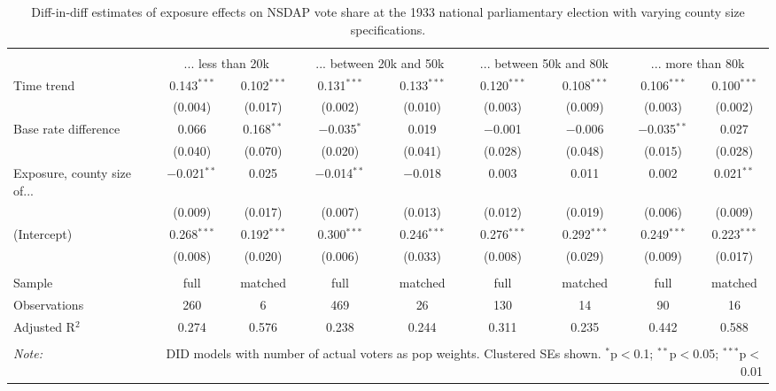 
\begin{table}[!htbp] \centering 
  \caption{Diff-in-diff estimates of exposure effects on NSDAP vote share at the 1933 national parliamentary election with varying county size specifications.\vspace{-.25cm}} 
  \label{tab:nsdap-voteshare-countysize-dd-1933} 
\scriptsize 
\begin{tabular}{@{\extracolsep{5pt}}lcccccccc} 
\\[-1.8ex]\hline 
\hline \\[-1.8ex] 
 & \multicolumn{2}{c}{... less than 20k } & \multicolumn{2}{c}{... between 20k and 50k} & \multicolumn{2}{c}{... between 50k and 80k} & \multicolumn{2}{c}{... more than 80k} \\ 
 \cmidrule(r){2-3}\cmidrule(r){4-5}\cmidrule(r){6-7}\cmidrule(r){8-9}Time trend & 0.143$^{***}$ & 0.102$^{***}$ & 0.131$^{***}$ & 0.133$^{***}$ & 0.120$^{***}$ & 0.108$^{***}$ & 0.106$^{***}$ & 0.100$^{***}$ \\ 
  & (0.004) & (0.017) & (0.002) & (0.010) & (0.003) & (0.009) & (0.003) & (0.002) \\ 
  Base rate difference & 0.066 & 0.168$^{**}$ & $-$0.035$^{*}$ & 0.019 & $-$0.001 & $-$0.006 & $-$0.035$^{**}$ & 0.027 \\ 
  & (0.040) & (0.070) & (0.020) & (0.041) & (0.028) & (0.048) & (0.015) & (0.028) \\ 
  Exposure, county size of... & $-$0.021$^{**}$ & 0.025 & $-$0.014$^{**}$ & $-$0.018 & 0.003 & 0.011 & 0.002 & 0.021$^{**}$ \\ 
  & (0.009) & (0.017) & (0.007) & (0.013) & (0.012) & (0.019) & (0.006) & (0.009) \\ 
  (Intercept) & 0.268$^{***}$ & 0.192$^{***}$ & 0.300$^{***}$ & 0.246$^{***}$ & 0.276$^{***}$ & 0.292$^{***}$ & 0.249$^{***}$ & 0.223$^{***}$ \\ 
  & (0.008) & (0.020) & (0.006) & (0.033) & (0.008) & (0.029) & (0.009) & (0.017) \\ 
 \hline \\[-1.8ex] 
Sample & full & matched & full & matched & full & matched & full & matched \\ 
Observations & 260 & 6 & 469 & 26 & 130 & 14 & 90 & 16 \\ 
Adjusted R$^{2}$ & 0.274 & 0.576 & 0.238 & 0.244 & 0.311 & 0.235 & 0.442 & 0.588 \\ 
\hline 
\hline \\[-1.8ex] 
\textit{Note:}  & \multicolumn{8}{r}{DID models with number of actual voters as pop weights. Clustered SEs shown. $^{*}$p$<$0.1; $^{**}$p$<$0.05; $^{***}$p$<$0.01} \\ 
\end{tabular} 
\end{table} 
